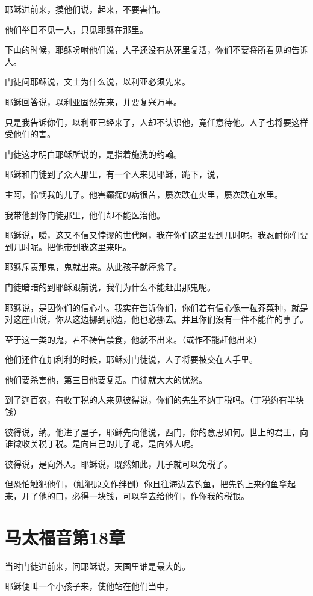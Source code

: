 \documentclass[12pt,oneside]{book}
\begin{document}
耶稣进前来，摸他们说，起来，不要害怕。

他们举目不见一人，只见耶稣在那里。

下山的时候，耶稣吩咐他们说，人子还没有从死里复活，你们不要将所看见的告诉人。

门徒问耶稣说，文士为什么说，以利亚必须先来。

耶稣回答说，以利亚固然先来，并要复兴万事。

只是我告诉你们，以利亚已经来了，人却不认识他，竟任意待他。人子也将要这样受他们的害。

门徒这才明白耶稣所说的，是指着施洗的约翰。

耶稣和门徒到了众人那里，有一个人来见耶稣，跪下，说，

主阿，怜悯我的儿子。他害癫痫的病很苦，屡次跌在火里，屡次跌在水里。

我带他到你门徒那里，他们却不能医治他。

耶稣说，嗳，这又不信又悖谬的世代阿，我在你们这里要到几时呢。我忍耐你们要到几时呢。把他带到我这里来吧。

耶稣斥责那鬼，鬼就出来。从此孩子就痊愈了。

门徒暗暗的到耶稣跟前说，我们为什么不能赶出那鬼呢。

耶稣说，是因你们的信心小。我实在告诉你们，你们若有信心像一粒芥菜种，就是对这座山说，你从这边挪到那边，他也必挪去。并且你们没有一件不能作的事了。

至于这一类的鬼，若不祷告禁食，他就不出来。（或作不能赶他出来）

他们还住在加利利的时候，耶稣对门徒说，人子将要被交在人手里。

他们要杀害他，第三日他要复活。门徒就大大的忧愁。

到了迦百农，有收丁税的人来见彼得说，你们的先生不纳丁税吗。（丁税约有半块钱）

彼得说，纳。他进了屋子，耶稣先向他说，西门，你的意思如何。世上的君王，向谁徵收关税丁税。是向自己的儿子呢，是向外人呢。

彼得说，是向外人。耶稣说，既然如此，儿子就可以免税了。

但恐怕触犯他们，（触犯原文作绊倒）你且往海边去钓鱼，把先钓上来的鱼拿起来，开了他的口，必得一块钱，可以拿去给他们，作你我的税银。

\chapter{马太福音第18章}
当时门徒进前来，问耶稣说，天国里谁是最大的。

耶稣便叫一个小孩子来，使他站在他们当中，
\end{document}
